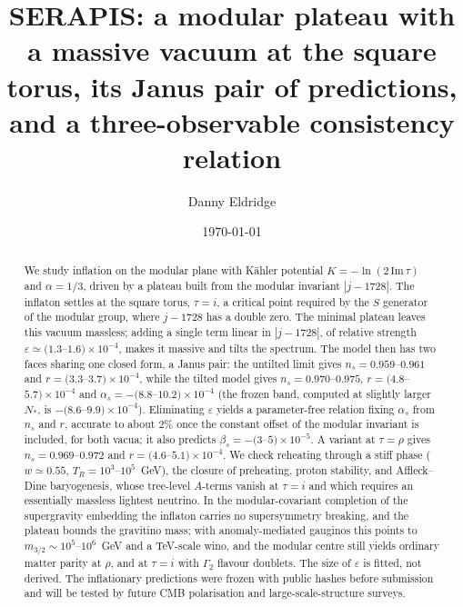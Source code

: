 \documentclass[aps,prd,twocolumn,superscriptaddress,nofootinbib,floatfix]{revtex4-2}
\begin{document}
\title{SERAPIS: a modular plateau with a massive vacuum at the square torus, its Janus pair of predictions, and a three-observable consistency relation}
\author{Danny Eldridge}
\date{\today}
\begin{abstract}
We study inflation on the modular plane with K\"ahler potential $K=-\ln(2\,\mathrm{Im}\,\tau)$ and $\alpha=1/3$, driven by a plateau built from the modular invariant $|j-1728|$. The inflaton settles at the square torus, $\tau=i$, a critical point required by the $S$ generator of the modular group, where $j-1728$ has a double zero. The minimal plateau leaves this vacuum massless; adding a single term linear in $|j-1728|$, of relative strength $\varepsilon\simeq(1.3$--$1.6)\times10^{-4}$, makes it massive and tilts the spectrum. The model then has two faces sharing one closed form, a Janus pair: the untilted limit gives $n_s=0.959$--$0.961$ and $r=(3.3$--$3.7)\times10^{-4}$, while the tilted model gives $n_s=0.970$--$0.975$, $r=(4.8$--$5.7)\times10^{-4}$ and $\alpha_s=-(8.8$--$10.2)\times10^{-4}$ (the frozen band, computed at slightly larger $N_*$, is $-(8.6$--$9.9)\times10^{-4}$). Eliminating $\varepsilon$ yields a parameter-free relation fixing $\alpha_s$ from $n_s$ and $r$, accurate to about $2\%$ once the constant offset of the modular invariant is included, for both vacua; it also predicts $\beta_s=-(3$--$5)\times10^{-5}$. A variant at $\tau=\rho$ gives $n_s=0.969$--$0.972$ and $r=(4.6$--$5.1)\times10^{-4}$. We check reheating through a stiff phase ($w\simeq0.55$, $T_R=10^3$--$10^5$~GeV), the closure of preheating, proton stability, and Affleck--Dine baryogenesis, whose tree-level $A$-terms vanish at $\tau=i$ and which requires an essentially massless lightest neutrino. In the modular-covariant completion of the supergravity embedding the inflaton carries no supersymmetry breaking, and the plateau bounds the gravitino mass; with anomaly-mediated gauginos this points to $m_{3/2}\sim10^5$--$10^6$~GeV and a TeV-scale wino, and the modular centre still yields ordinary matter parity at $\rho$, and at $\tau=i$ with $\Gamma_2$ flavour doublets. The size of $\varepsilon$ is fitted, not derived. The inflationary predictions were frozen with public hashes before submission and will be tested by future CMB polarisation and large-scale-structure surveys.
\end{abstract}
\maketitle
\end{document}
